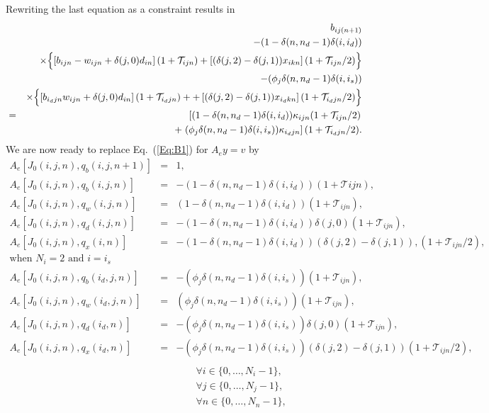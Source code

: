 \documentclass{report}[fleqn,12pt]
\begin{document}
Rewriting the last equation as a constraint results in
\begin{eqnarray}
	&&b_{ij(n+1)} 
	  \nonumber  \\
	&& - (1 - \delta(n, n_d-1)\delta(i, i_d)) \nonumber\\
	&& \times \Bigl\{ \left[b_{ijn} - w_{ijn} + \delta(j, 0)d_{in} \right](1 + \mathcal{T}_{ijn})
	+ \left[(\delta(j, 2) - \delta(j, 1))x_{ikn}\right](1 + \mathcal{T}_{ijn}/2) \Bigr\}
	\nonumber \\
	&&- (\phi_j\delta(n, n_d-1)\delta(i, i_s)) \nonumber \\
	&& \times \Bigl\{ \left[b_{i_djn} w_{ijn} + \delta(j, 0)d_{in}\right](1 + \mathcal{T}_{i_djn}) +
	+ \left[(\delta(j, 2) - \delta(j, 1))x_{i_dkn}\right](1 + \mathcal{T}_{i_djn}/2) \Bigr\}
	\nonumber \\
	&=& \left[(1 - \delta(n, n_d-1)\delta(i, i_d)) \kappa_{ijn} (1 + \mathcal{T}_{ijn}/2) \right.
	\nonumber\\
	&& + \left.(\phi_j\delta(n, n_d-1)\delta(i, i_s))
	\kappa_{i_djn}\right](1 + \mathcal{T}_{i_djn}/2).
\end{eqnarray}
We are now ready to replace Eq.~(\ref{Eq:B1}) for $A_ey = v$ by
\begin{eqnarray}
        \label{Eq:B2}
        A_e[J_0(i, j, n), q_b(i, j, n+1)] &=& 1, \nonumber \\
        A_e[J_0(i, j, n), q_b(i, j, n)] &=& - (1 - \delta(n, n_d-1)\delta(i, i_d))
		(1 + \mathcal{T}{ijn}), \nonumber \\
        A_e[J_0(i, j, n), q_w(i, j, n)] &=& (1 - \delta(n, n_d-1)\delta(i, i_d))
	(1 + \mathcal{T}_{ijn}),\nonumber \\
        A_e[J_0(i, j, n), q_d(i, j, n)] &=& - (1 - \delta(n, n_d-1)\delta(i, i_d))
		\delta(j, 0) (1 + \mathcal{T}_{ijn}), \nonumber \\
        A_e[J_0(i, j, n), q_x(i, n)] &=& - (1 - \delta(n, n_d-1)\delta(i, i_d))
                (\delta(j, 2) - \delta(j, 1)),
		(1 + \mathcal{T}_{ijn}/2), \nonumber \\
		\text{when $N_i =2$ and $i = i_s$} && \nonumber\\
        A_e[J_0(i, j, n), q_b(i_d, j, n)] &=& - (\phi_j\delta(n, n_d-1)\delta(i, i_s))
		(1 + \mathcal{T}_{ijn}), \nonumber \\
        A_e[J_0(i, j, n), q_w(i_d, j, n)] &=& (\phi_j\delta(n, n_d-1)\delta(i, i_s))
	(1 + \mathcal{T}_{ijn}), \nonumber\\
        A_e[J_0(i, j, n), q_d(i_d, n)] &=&  -(\phi_j\delta(n, n_d-1)\delta(i, i_s))
		\delta(j, 0)(1 + \mathcal{T}_{ijn}), \nonumber \\
        A_e[J_0(i, j, n), q_x(i_d, n)] &=& - (\phi_j\delta(n, n_d-1)\delta(i, i_s))
                (\delta(j, 2) - \delta(j, 1))
		(1 + \mathcal{T}_{ijn}/2), \nonumber \\
                \nonumber \\
        &&\qquad\forall i \in \{0,\ldots, N_i-1\},\nonumber\\
        &&\qquad\forall j \in \{0,\ldots, N_j-1\},\nonumber\\
        &&\qquad\forall n \in \{0,\ldots, N_n-1\}, \nonumber
\end{eqnarray}
\end{document}
